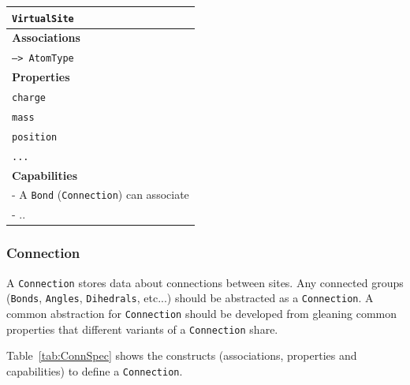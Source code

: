 \documentclass[12pt]{article}
\begin{document}
\begin{table}[ht]
\begin{subtable}[h]{0.45\textwidth}
\begin{tabular}{|l|}
         \hline
         \rowcolor{gray!50}
         \texttt{VirtualSite}  \\
         \hline
         \textbf{Associations} \\
         \hline
         \texttt{--> AtomType}\\
         \textbf{Properties}\\
         \hline
         \texttt{charge} \\
         \texttt{mass} \\
         \texttt{position}\\
         \texttt{...}\\
         \hline
         \textbf{Capabilities}\\
         \hline
         - A \texttt{Bond} (\texttt{Connection}) can associate\\
         - ..\\
        \hline
    \end{tabular}
    \end{subtable}

\end{table}


\pagebreak


\subsubsection{Connection}
A \texttt{Connection} stores data about connections between sites. Any connected groups (\texttt{Bonds}, \texttt{Angles}, \texttt{Dihedrals}, etc...) should be abstracted as a \texttt{Connection}. A common abstraction for \texttt{Connection} should be developed from gleaning common properties that different variants of a \texttt{Connection} share.

Table~\ref{tab:ConnSpec} shows  the constructs (associations, properties and capabilities) to define a \texttt{Connection}.
\end{document}
